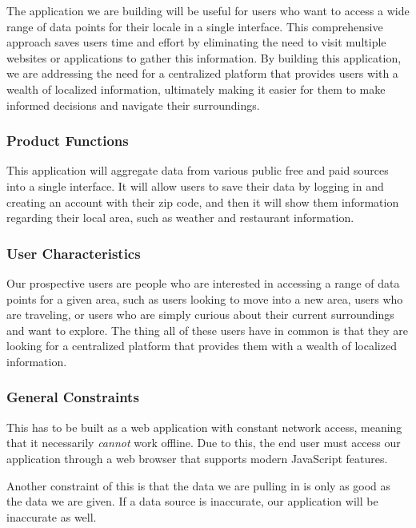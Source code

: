 \documentclass[12pt]{article}
\begin{document}
The application we are building will be useful for users who want to access a wide range of data points for their locale in a single interface. This comprehensive approach saves users time and effort by eliminating the need to visit multiple websites or applications to gather this information. By building this application, we are addressing the need for a centralized platform that provides users with a wealth of localized information, ultimately making it easier for them to make informed decisions and navigate their surroundings.

\subsubsection{Product Functions}

This application will aggregate data from various public free and paid sources into a single interface. It will allow users to save their data by logging in and creating an account with their zip code, and then it will show them information regarding their local area, such as weather and restaurant information.

\subsubsection{User Characteristics}

Our prospective users are people who are interested in accessing a range of data points for a given area, such as users looking to move into a new area, users who are traveling, or users who are simply curious about their current surroundings and want to explore. The thing all of these users have in common is that they are looking for a centralized platform that provides them with a wealth of localized information.

\subsubsection{General Constraints}

This has to be built as a web application with constant network access, meaning that it necessarily \textit{cannot} work offline. Due to this, the end user must access our application through a web browser that supports modern JavaScript features.

Another constraint of this is that the data we are pulling in is only as good as the data we are given. If a data source is inaccurate, our application will be inaccurate as well.
\end{document}
